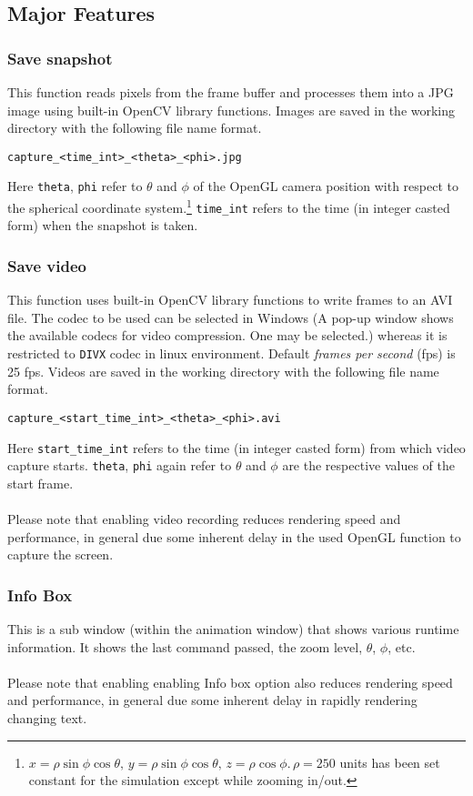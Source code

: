 \documentclass[10pt,a4paper]{article}
\begin{document}
\subsection{Major Features}
\subsubsection{Save snapshot}
This function reads pixels from the frame buffer and processes them into a JPG image using built-in OpenCV library functions. Images are saved in the working directory with the following file name format.
\begin{verbatim}
capture_<time_int>_<theta>_<phi>.jpg
\end{verbatim}
Here \texttt{theta}, \texttt{phi} refer to $\theta$ and $\phi$ of the OpenGL camera position with respect to the spherical coordinate system.\footnote{$x=\rho\sin\phi\cos\theta, \,y=\rho\sin\phi\cos\theta, \,z=\rho\cos\phi. \, \rho=250$ units has been set constant for the simulation except while zooming in/out.} \texttt{time\_int} refers to the time (in integer casted form) when the snapshot is taken.
\subsubsection{Save video}
This function uses built-in OpenCV library functions to write frames to an AVI file. The codec to be used can be selected in Windows (A pop-up window shows the available codecs for video compression. One may be selected.) whereas it is restricted to \texttt{DIVX} codec in linux environment. Default \emph{frames per second} (fps) is 25 fps. Videos are saved in the working directory with the following file name format.
\begin{verbatim}
capture_<start_time_int>_<theta>_<phi>.avi
\end{verbatim}

Here \texttt{start\_time\_int} refers to the time (in integer casted form) from which video capture starts. \texttt{theta}, \texttt{phi} again refer to $\theta$ and $\phi$ are the respective values of the start frame. \\ \\
Please note that enabling video recording reduces rendering speed and performance, in general due some inherent delay in the used OpenGL function to capture the screen.
\subsubsection{Info Box}
This is a sub window (within the animation window) that shows various runtime information. It shows the last command passed, the zoom level, $\theta$, $\phi$, etc. \\ \\
Please note that enabling enabling Info box option also reduces rendering speed and performance, in general due some inherent delay in rapidly rendering changing text.
%
%
\end{document}

